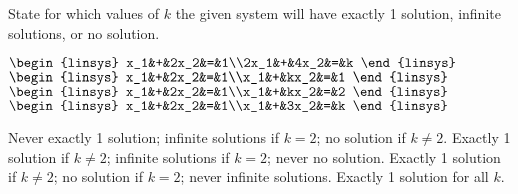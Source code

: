 
\begin{Exercise}[
name={},
title={}, 
difficulty=0,
origin={\cite{GH}}]
State for which values of $k$ the given system will have exactly 1 solution, infinite solutions, or no solution.
\begin{multicols}{2}
\Question 
$
\begin{linsys}{2}
x_1&+&2x_2&=&1\\2x_1&+&4x_2&=&k
\end{linsys}
$
\Question
$
\begin{linsys}{2}
x_1&+&2x_2&=&1\\x_1&+&kx_2&=&1
\end{linsys}
$
\Question
$
\begin{linsys}{2}
x_1&+&2x_2&=&1\\x_1&+&kx_2&=&2
\end{linsys}
$
\Question
$
\begin{linsys}{2}
x_1&+&2x_2&=&1\\x_1&+&3x_2&=&k
\end{linsys}
$
\EndCurrentQuestion
\end{multicols}
\end{Exercise}

\begin{Answer}
\Question Never exactly 1 solution; infinite solutions if $k=2$; no solution if $k\neq 2$.
\Question Exactly 1 solution if $k\neq 2$; infinite solutions if $k=2$; never no solution.
\Question Exactly 1 solution if $k\neq 2$; no solution if $k=2$; never infinite solutions.
\Question Exactly 1 solution for all $k$.
\end{Answer}
